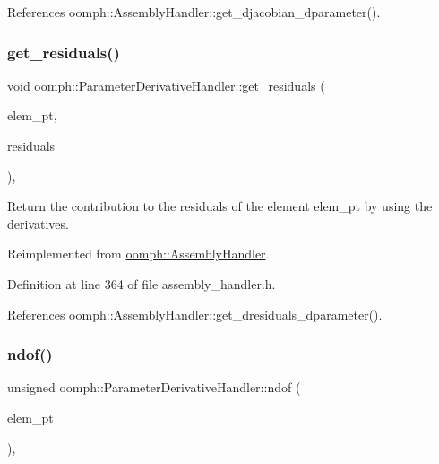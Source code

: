 References oomph\+::\+Assembly\+Handler\+::get\+\_\+djacobian\+\_\+dparameter().

\mbox{\label{classoomph_1_1ParameterDerivativeHandler_a8ba1dbc805c00ac75e6d5d53f1b014c1}} 
\subsubsection{\texorpdfstring{get\+\_\+residuals()}{get\_residuals()}}
{\footnotesize\ttfamily void oomph\+::\+Parameter\+Derivative\+Handler\+::get\+\_\+residuals (\begin{DoxyParamCaption}\item[{\hyperlink{classoomph_1_1GeneralisedElement}{Generalised\+Element} $\ast$const \&}]{elem\+\_\+pt,  }\item[{\hyperlink{classoomph_1_1Vector}{Vector}$<$ double $>$ \&}]{residuals }\end{DoxyParamCaption})\hspace{0.3cm}{\ttfamily [inline]}, {\ttfamily [virtual]}}



Return the contribution to the residuals of the element elem\+\_\+pt by using the derivatives. 



Reimplemented from \hyperlink{classoomph_1_1AssemblyHandler_a7a6203b0ab90da62b4da2af8a26d08b3}{oomph\+::\+Assembly\+Handler}.



Definition at line 364 of file assembly\+\_\+handler.\+h.



References oomph\+::\+Assembly\+Handler\+::get\+\_\+dresiduals\+\_\+dparameter().

\mbox{\label{classoomph_1_1ParameterDerivativeHandler_a341d4e7cfaab7e66df43913d775a6871}} 
\subsubsection{\texorpdfstring{ndof()}{ndof()}}
{\footnotesize\ttfamily unsigned oomph\+::\+Parameter\+Derivative\+Handler\+::ndof (\begin{DoxyParamCaption}\item[{\hyperlink{classoomph_1_1GeneralisedElement}{Generalised\+Element} $\ast$const \&}]{elem\+\_\+pt }\end{DoxyParamCaption})\hspace{0.3cm}{\ttfamily [inline]}, {\ttfamily [virtual]}}

